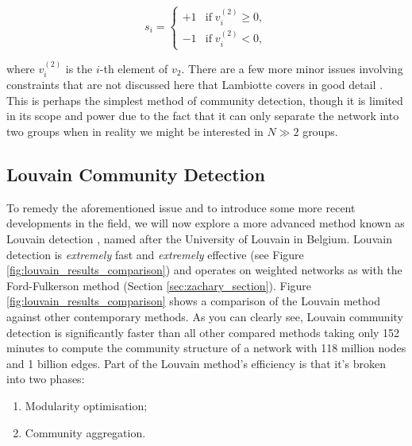 $$ s_i = \begin{cases}
    +1 & \text{if} \; v_i^{(2)} \geq 0, \\
    -1 & \text{if} \; v_i^{(2)} < 0,
\end{cases} $$

where $v_i^{(2)}$ is the $i$-th element of $v_2$. There are a few more minor issues involving constraints that are not discussed here that Lambiotte covers in good detail \cite[27]{oxford:renaud_notes}. This is perhaps the simplest method of community detection, though it is limited in its scope and power due to the fact that it can only separate the network into two groups when in reality we might be interested in $N \gg 2$ groups.

\subsection{Louvain Community Detection}
To remedy the aforementioned issue and to introduce some more recent developments in the field, we will now explore a more advanced method known as Louvain detection \cite{Blondel_2008}, named after the University of Louvain in Belgium. Louvain detection is \emph{extremely} fast and \emph{extremely} effective (see Figure \ref{fig:louvain_results_comparison}) and operates on weighted networks as with the Ford-Fulkerson method (Section \ref{sec:zachary_section}). Figure \ref{fig:louvain_results_comparison} shows a comparison of the Louvain method against other contemporary methods. As you can clearly see, Louvain community detection is significantly faster than all other compared methods taking only 152 minutes to compute the community structure of a network with 118 million nodes and 1 billion edges. Part of the Louvain method's efficiency is that it's broken into two phases:

\begin{enumerate}
    \item Modularity optimisation;
    \item Community aggregation.
\end{enumerate}


